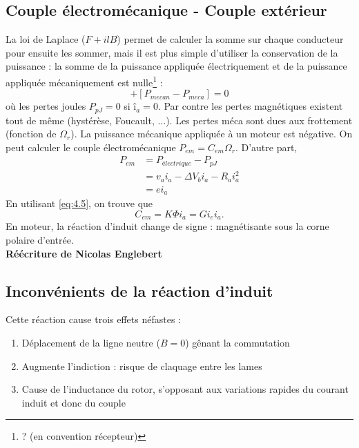		\subsection{Couple électromécanique - Couple extérieur}
		La loi de Laplace ($F+ilB$) permet de calculer la somme sur 
		chaque conducteur pour ensuite les sommer, mais il est plus 
		simple d'utiliser la conservation de la puissance : la somme 
		de la puissance appliquée électriquement et de la puissance 
		appliquée mécaniquement est nulle\footnote{? (en convention 
		récepteur)} :
		\begin{equation}
		[\underbrace{P_{electrique} - (P_{pJoule}}_{P_{electromecanique}}
		+P_{pmagn})] + [P_{mecan}-P_{meca}]=0
		\end{equation}
		où les pertes joules $P_{pJ}=0$ si $î_a=0$. Par contre les pertes 
		magnétiques existent tout de même (hystérèse, Foucault, ...). Les 
		pertes méca sont dues aux frottement (fonction de $\Omega_r$). La 
		puissance mécanique appliquée à un moteur est négative. On peut 
		calculer le couple électromécanique $P_{em} = C_{em}\Omega_r$. D'autre part,
		\begin{equation}
		\begin{aligned}
			P_{em} &= P_{électrique} - P_{pJ}\\
						 &= v_a i_a - \Delta V_b i_a -R_a i_a^2\\
						 &= e i_a
		\end{aligned}
		\end{equation}
		En utilisant \autoref{eq:4.5}, on trouve que 
		\begin{equation}
			C_{em} = K\Phi i_a = Gi_ei_a.
		\end{equation}
		En moteur, la réaction d'induit change de signe : magnétisante sous la corne polaire d'entrée.\\
		
		\textbf{Réécriture de Nicolas Englebert}
		
	\subsection{Inconvénients de la réaction d'induit}
	Cette réaction cause trois effets néfastes :
	\begin{enumerate}
	\item Déplacement de la ligne neutre ($B=0$) gênant la commutation
	\item Augmente l'indiction : risque de claquage entre les lames
	\item Cause de l'inductance du rotor, s’opposant aux variations rapides 
	du courant induit et donc du couple
	\end{enumerate}
	

